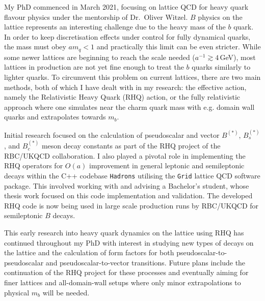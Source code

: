 \documentclass[11pt, a4paper]{awesome-cv}
\begin{document}
\begin{cvletter}
My PhD commenced in March 2021, focusing on lattice QCD for heavy quark flavour physics under the mentorship of Dr.~Oliver Witzel. 
$B$ physics on the lattice represents an interesting challenge due to the heavy mass of the $b$ quark.
In order to keep discretisation effects under control for fully dynamical quarks, the mass must obey $am_q<1$ and practically this limit can be even stricter. 
While some newer lattices are beginning to reach the scale needed ($a^{-1}\gtrsim4\,$GeV), most lattices in production are not yet fine enough to treat the $b$ quarks similarly to lighter quarks. 
To circumvent this problem on current lattices, there are two main methods, both of which I have dealt with in my research: the effective action, namely the Relativistic Heavy Quark (RHQ) action, or the fully relativistic approach where one simulates near the charm quark mass with e.g. domain wall quarks and extrapolates towards $m_b$.

Initial research focused on the calculation of pseudoscalar and vector $B^{(*)}$, $B_s^{(*)}$, and $B_c^{(*)}$ meson decay constants as part of the RHQ project of the RBC/UKQCD collaboration. 
I also played a pivotal role in implementing the RHQ operators for $O(a)$ improvement in general leptonic and semileptonic decays within the C++ codebase {\tt Hadrons} utilising the {\tt Grid} lattice QCD software package. 
This involved working with and advising a Bachelor's student, whose thesis work focused on this code implementation and validation.
The developed RHQ code is now being used in large scale production runs by RBC/UKQCD for semileptonic $B$ decays.

This early research into heavy quark dynamics on the lattice using RHQ has continued throughout my PhD with interest in studying new types of decays on the lattice and the calculation of form factors for both pseudoscalar-to-pseudoscalar and pseudoscalar-to-vector transitions.
Future plans include the continuation of the RHQ project for these processes and eventually aiming for finer lattices and all-domain-wall setups where only minor extrapolations to physical $m_b$ will be needed.


\end{cvletter}
\end{document}
